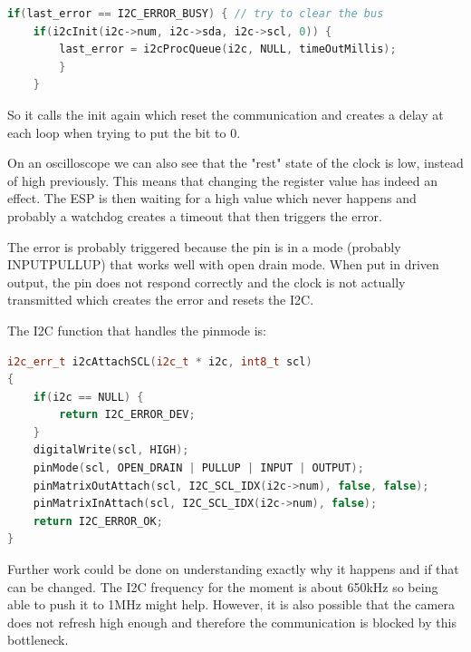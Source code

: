 \documentclass[a4paper]{article}
\begin{document}
\begin{lstlisting}[language=C++]
if(last_error == I2C_ERROR_BUSY) { // try to clear the bus
    if(i2cInit(i2c->num, i2c->sda, i2c->scl, 0)) {
        last_error = i2cProcQueue(i2c, NULL, timeOutMillis);
        }
    }
\end{lstlisting}

So it calls the init again which reset the communication and creates a delay at each loop when trying to put the bit to 0. 

On an oscilloscope we can also see that the "rest" state of the clock is low, instead of high previously. This means that changing the register value has indeed an effect. The ESP is then waiting for a high value which never happens and probably a watchdog creates a timeout that then triggers the error.

 The error is probably triggered because the pin is in a mode (probably INPUTPULLUP) that works well with open drain mode. When put in driven output, the pin does not respond correctly and the clock is not actually transmitted which creates the error and resets the I2C.

The I2C function that handles the pinmode is:
\begin{lstlisting}[language=C++]
i2c_err_t i2cAttachSCL(i2c_t * i2c, int8_t scl)
{
    if(i2c == NULL) {
        return I2C_ERROR_DEV;
    }
    digitalWrite(scl, HIGH);
    pinMode(scl, OPEN_DRAIN | PULLUP | INPUT | OUTPUT);
    pinMatrixOutAttach(scl, I2C_SCL_IDX(i2c->num), false, false);
    pinMatrixInAttach(scl, I2C_SCL_IDX(i2c->num), false);
    return I2C_ERROR_OK;
}
\end{lstlisting}

Further work could be done on understanding exactly why it happens and if that can be changed. The I2C frequency for the moment is about 650kHz so being able to push it to 1MHz might help.
However, it is also possible that the camera does not refresh high enough and therefore the communication is blocked by this bottleneck.

\appendix






\end{document}
